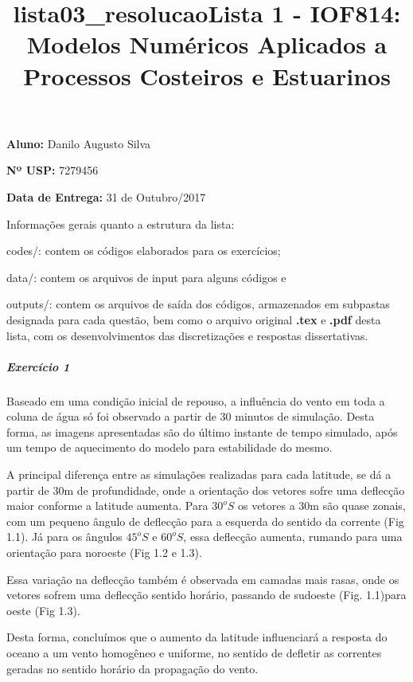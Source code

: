 \documentclass[11pt]{article}
\title{lista03\_resolucao}
\begin{document}
\title{Lista 1 - IOF814: Modelos Numéricos Aplicados a Processos Costeiros e Estuarinos}
\maketitle

\begin{center}
\textbf{Aluno:} Danilo Augusto Silva

\textbf{Nº USP:} 7279456

\textbf{Data de Entrega:} 31 de Outubro/2017
\end{center}
\vspace{0.5in}
Informações gerais quanto a estrutura da lista:

codes/: contem os códigos elaborados para os exercícios;

data/: contem os arquivos de input para alguns códigos e

outputs/: contem os arquivos de saída dos códigos, armazenados em
subpastas designada para cada questão, bem como o arquivo original \textbf{.tex}
e \textbf{.pdf} desta lista, com os desenvolvimentos das discretizações e
respostas dissertativas.

    \subparagraph{Exercício 1}\label{exercuxedcio-1}

Baseado em uma condição inicial de repouso, a influência do vento em
toda a coluna de água só foi observado a partir de 30 minutos de
simulação. Desta forma, as imagens apresentadas são do último instante
de tempo simulado, após um tempo de aquecimento do modelo para
estabilidade do mesmo.

A principal diferença entre as simulações realizadas para cada latitude,
se dá a partir de 30m de profundidade, onde a orientação dos vetores
sofre uma deflecção maior conforme a latitude aumenta. Para \(30^oS\) os
vetores a 30m são quase zonais, com um pequeno ângulo de deflecção para
a esquerda do sentido da corrente (Fig 1.1). Já para os ângulos
\(45^oS\) e \(60^oS\), essa deflecção aumenta, rumando para uma
orientação para noroeste (Fig 1.2 e 1.3).

Essa variação na deflecção também é observada em camadas mais rasas,
onde os vetores sofrem uma deflecção sentido horário, passando de
sudoeste (Fig. 1.1)para oeste (Fig 1.3).

Desta forma, concluímos que o aumento da latitude influenciará a
resposta do oceano a um vento homogêneo e uniforme, no sentido de
defletir as correntes geradas no sentido horário da propagação do vento.
\end{document}
